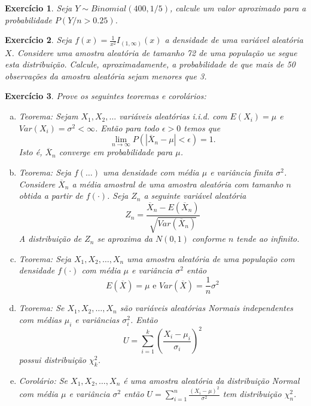 \documentclass[letter,11pt]{article}
\newtheorem{exer}{Exercício}
\begin{document}
\begin{exer} \rm
Seja $Y \sim Binomial (400, 1/5)$, calcule um valor aproximado para a 
probabilidade $P(Y/n > 0.25)$.
\end{exer}


\begin{exer} \rm
Seja $f(x) = \frac{1}{x^2} I_{(1, \infty)}(x)$ a densidade de uma variável 
aleatória $X$. Considere uma amostra aleatória de tamanho 72 de uma população 
ue segue esta distribuição. Calcule, aproximadamente, a probabilidade de que 
mais de 50 observações da amostra aleatória sejam menores que 3.
\end{exer}


\begin{exer} \rm
Prove os seguintes teoremas e corolários:
\begin{enumerate}[a)]
  \item Teorema: Sejam $X_1, X_2, \ldots$ variáveis aleatórias i.i.d. com 
  $E(X_i)=\mu$ e $Var(X_i)=\sigma^2 < \infty$. 
  \vspace{0.4cm}
  Então para todo $\epsilon > 0$ temos que
  $$
  \lim_{n\rightarrow \infty}P(|\overline{X}_n-\mu| < \epsilon)=1.
  $$
  \vspace{0.4cm}
  Isto é, $\overline{X}_n$ converge em probabilidade para $\mu$.

  \item Teorema: Seja $f(\ldots)$ uma densidade com média $\mu$ e variância 
  finita $\sigma^2$. Considere $\overline{X}_n$ a média amostral de uma amostra 
  aleatória com tamanho $n$ obtida a partir de $f(\cdot)$. Seja $Z_n$ a seguinte 
  variável aleatória
  $$
  Z_n=\frac{\overline{X}_n-E(\overline{X}_n)}{\sqrt{Var(\overline{X}_n)}}
  $$
  A distribuição de $Z_n$ se aproxima da $N(0,1)$ conforme $n$ tende ao infinito.
  
  \item Teorema: Seja $X_1, X_2, \ldots, X_n$ uma amostra aleatória de uma 
  população com densidade $f(\cdot)$ com média $\mu$ e variância $\sigma^2$ então
  $$
  E(\overline{X})=\mu \mbox{ e } Var(\overline{X})=\frac{1}{n}\sigma^2
  $$
  
  \item Teorema: Se $X_1, X_2, \ldots, X_n$ são variáveis aleatórias Normais 
  independentes com médias $\mu_i$ e variâncias $\sigma_i^2$. Então
  $$
  U= \sum_{i=1}^k\left( \frac{X_i - \mu_i}{\sigma_i}\right)^2
  $$
  possui distribuição $\chi_k^2$.

  \item Corolário: Se $X_1, X_2, \ldots, X_n$ é uma amostra aleatória da 
  distribuição Normal com média $\mu$ e variância $\sigma^2$ então 
  $U=\sum_{i=1}^n \frac{(X_i-\mu)^2}{\sigma^2}$ tem distribuição $\chi^2_n$.


\end{enumerate}
\end{exer}
\end{document}
